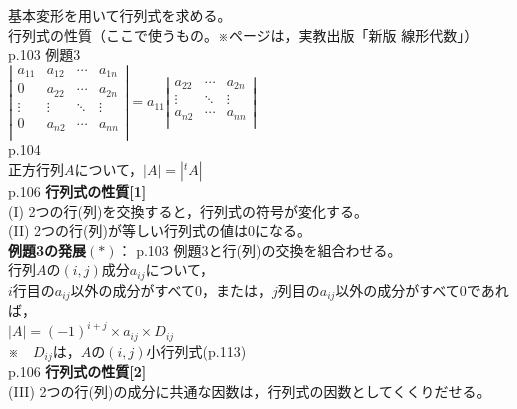 \documentclass[a4paper,10pt,onecolumn,oneside,notitlepage,final]{jsarticle} %
\begin{document}
\large
\noindent 基本変形を用いて行列式を求める。\\ %

行列式の性質（ここで使うもの。※ページは，実教出版「新版 線形代数」）\\

p.103 例題3\\
$\left|\begin{array}{ccccc}
a_{11}&a_{12}&\cdots&a_{1n}\\
   0  &a_{22}&\cdots&a_{2n}\\
\vdots&\vdots&\ddots&\vdots\\
   0  &a_{n2}&\cdots&a_{nn}\\
\end{array}\right|
=a_{11}
\left|\begin{array}{cccc}
a_{22}&\cdots&a_{2n}\\
\vdots&\ddots&\vdots\\
a_{n2}&\cdots&a_{nn}\\
\end{array}\right|$\\

p.104\\
正方行列$A$について，$|A|=|^tA|$\\

p.106 {\bf 行列式の性質{[1]}}\\
(I) 2つの行(列)を交換すると，行列式の符号が変化する。\\
(II) 2つの行(列)が等しい行列式の値は$0$になる。\\

{\bf 例題3の発展}$(\ast)$：
p.103 例題3と行(列)の交換を組合わせる。\\
行列$A$の$(i,j)$成分$a_{ij}$について，\\
$i$行目の$a_{ij}$以外の成分がすべて$0$，または，$j$列目の$a_{ij}$以外の成分がすべて$0$であれば，\\
$|A|=(-1)^{i+j}\times a_{ij}\times D_{ij}$\\
※　$D_{ij}$は，$A$の$(i,j)$小行列式(p.113)\\

p.106 {\bf 行列式の性質{[2]}}\\
(III) 2つの行(列)の成分に共通な因数は，行列式の因数としてくくりだせる。\\
\end{document}
